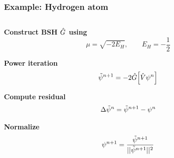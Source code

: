 \begin{frame}
  \frametitle{Example: Hydrogen atom}
  \begin{columns}
    \begin{column}[b]{0.4\textwidth}
      \centering
      \textbf{Construct BSH $\hat{G}$ using}
      \begin{equation}
        \nonumber
        \mu = \sqrt{-2E_H}, \qquad  E_H = -\frac{1}{2}
      \end{equation}

      \vspace{2mm}

      \textbf{Power iteration}
      \begin{equation}
        \nonumber
        \tilde{\psi}^{n+1} = -2\hat{G} \Big[\hat{V} \psi^n \Big]
      \end{equation}

      \vspace{2mm}

      \textbf{Compute residual}
      \begin{equation}
        \nonumber
        \Delta\tilde{\psi}^{n} = \tilde{\psi}^{n+1} - \psi^n
      \end{equation}

      \vspace{2mm}

      \textbf{Normalize}
      \begin{equation}
        \nonumber
        \psi^{n+1} = \frac{\tilde{\psi}^{n+1}}{||\tilde{\psi}^{n+1}||^2}
      \end{equation}

      \vspace{3mm}


\end{column}
\end{columns}
\end{frame}
